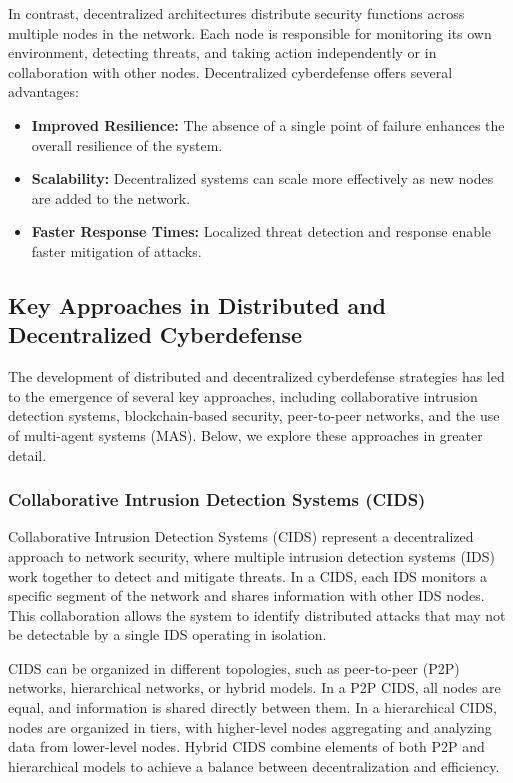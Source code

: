In contrast, decentralized architectures distribute security functions across multiple nodes in the network. Each node is responsible for monitoring its own environment, detecting threats, and taking action independently or in collaboration with other nodes. Decentralized cyberdefense offers several advantages:

\begin{itemize}
    \item \textbf{Improved Resilience:} The absence of a single point of failure enhances the overall resilience of the system.
    \item \textbf{Scalability:} Decentralized systems can scale more effectively as new nodes are added to the network.
    \item \textbf{Faster Response Times:} Localized threat detection and response enable faster mitigation of attacks.
\end{itemize}

\subsection{Key Approaches in Distributed and Decentralized Cyberdefense}

The development of distributed and decentralized cyberdefense strategies has led to the emergence of several key approaches, including collaborative intrusion detection systems, blockchain-based security, peer-to-peer networks, and the use of multi-agent systems (MAS). Below, we explore these approaches in greater detail.

\subsubsection{Collaborative Intrusion Detection Systems (CIDS)}

Collaborative Intrusion Detection Systems (CIDS) represent a decentralized approach to network security, where multiple intrusion detection systems (IDS) work together to detect and mitigate threats. In a CIDS, each IDS monitors a specific segment of the network and shares information with other IDS nodes. This collaboration allows the system to identify distributed attacks that may not be detectable by a single IDS operating in isolation.

CIDS can be organized in different topologies, such as peer-to-peer (P2P) networks, hierarchical networks, or hybrid models. In a P2P CIDS, all nodes are equal, and information is shared directly between them. In a hierarchical CIDS, nodes are organized in tiers, with higher-level nodes aggregating and analyzing data from lower-level nodes. Hybrid CIDS combine elements of both P2P and hierarchical models to achieve a balance between decentralization and efficiency.

